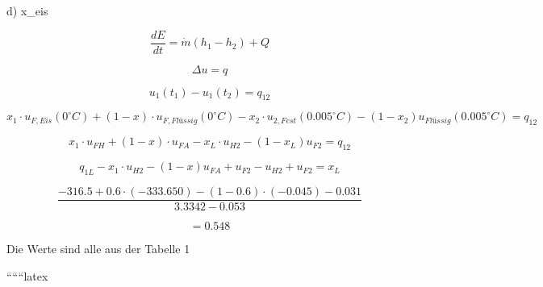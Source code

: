 d) \quad x_{eis}

\[
\frac{dE}{dt} = \dot{m} (h_1 - h_2) + Q
\]

\[
\Delta u = q
\]

\[
u_1 (t_1) - u_1 (t_2) = q_{12}
\]

\[
x_1 \cdot u_{F, Eis} (0^\circ C) + (1 - x) \cdot u_{F, Flüssig} (0^\circ C) - x_2 \cdot u_{2, Fest} (0.005^\circ C) - (1 - x_2) u_{Flüssig} (0.005^\circ C) = q_{12}
\]

\[
x_1 \cdot u_{FH} + (1 - x) \cdot u_{FA} - x_L \cdot u_{H2} - (1 - x_L) u_{F2} = q_{12}
\]

\[
q_{1L} - x_1 \cdot u_{H2} - (1 - x) u_{FA} + u_{F2} - u_{H2} + u_{F2} = x_L
\]

\[
\frac{-316.5 + 0.6 \cdot (-333.650) - (1 - 0.6) \cdot (-0.045) - 0.031}{3.3342 - 0.053}
\]

\[
= 0.548
\]

Die Werte sind alle aus der Tabelle 1

``````latex